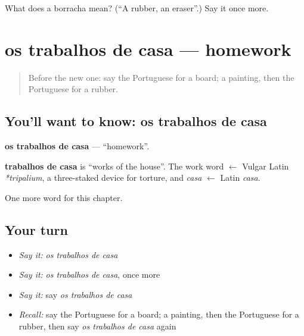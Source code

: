 \begin{tcolorbox}[breakable,colback=teal!4,colframe=teal!35!black,title={Before you move on}]
What does a borracha mean? (\textquotedblleft{}A rubber, an eraser\textquotedblright{}.) Say it once more.
\end{tcolorbox}
\section[os trabalhos de casa]{os trabalhos de casa — homework}

\label{lesson:PT-C113-trabalhos-de-casa}



\begin{quote}
Before the new one: say the Portuguese for a board; a painting, then the Portuguese for a rubber.
\end{quote}

\subsection*{You'll want to know: os trabalhos de casa}
\textbf{os trabalhos de casa} — \textquotedblleft{}homework\textquotedblright{}.

\begin{cousinweb}
\textbf{trabalhos de casa} is \textquotedblleft{}works of the house\textquotedblright{}. The work word $\leftarrow$ Vulgar Latin \emph{*tripalium}, a three-staked device for torture, and \emph{casa} $\leftarrow$ Latin \emph{casa}.
\end{cousinweb}

\begin{grammarlens}[title={What you've built}]
One more word for this chapter.
\end{grammarlens}

\subsection*{Your turn}
\begin{itemize}
\raggedright
  \item \emph{Say it:} \emph{os trabalhos de casa}
  \item \emph{Say it:} \emph{os trabalhos de casa}, once more
  \item \emph{Say it:} say \emph{os trabalhos de casa}
  \item \emph{Recall:} say the Portuguese for a board; a painting, then the Portuguese for a rubber, then say \emph{os trabalhos de casa} again
\end{itemize}

